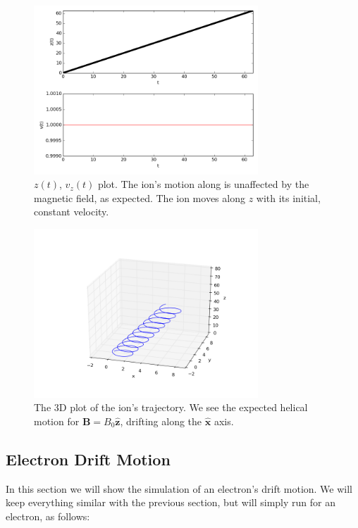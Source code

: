 \documentclass[11pt]{report}
\begin{document}
\begin{figure}[!ht]
  \centering
    \includegraphics[width=0.75\textwidth]{images/drift_ion_z}
     \caption{$z(t)$, $v_z(t)$ plot. The ion's motion along  is unaffected by the magnetic field, as expected. The ion moves along $z$ with its initial, constant velocity.}
\end{figure}

\begin{figure}[!ht]
  \centering
    \includegraphics[width=0.75\textwidth]{images/drift_ion_3d}
     \caption{The 3D plot of the ion's trajectory. We see the expected helical motion for $\bm{B} = B_0 \hat{\bm{z}}$, drifting along the $\hat{\bm{x}}$ axis.}
\end{figure}

\newpage

\subsection{Electron Drift Motion}
In this section we will show the simulation of an electron's drift motion. We will keep everything similar with the previous section, but will simply run for an electron, as follows:
\end{document}
